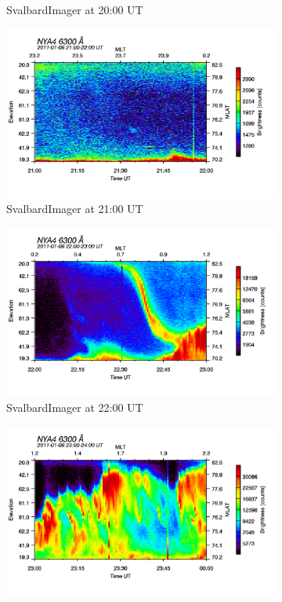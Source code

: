 \documentclass[10pt,a4paper]{article}
\begin{document}
\begin{figure}[h]
\begin{subfigure}{0.3\textwidth}
	\caption{ SvalbardImager at 20:00 UT \label{SBI_6_20}}
\end{subfigure}
\begin{subfigure}{0.3\textwidth}
\centering
	\includegraphics[width=\textwidth]{SvalbardImager6300A21.png}
	\caption{ SvalbardImager at 21:00 UT \label{SBI_6_21}}
\end{subfigure}
\begin{subfigure}{0.3\textwidth}
\centering
		\includegraphics[width=\textwidth]{SvalbardImager6300A22.png}
	\caption{ SvalbardImager at 22:00 UT \label{SBI_6_22}}
\end{subfigure}
\begin{subfigure}{0.3\textwidth}
\centering
	\includegraphics[width=\textwidth]{SvalbardImager6300A23.png}

\end{subfigure}
\end{figure}
\end{document}
